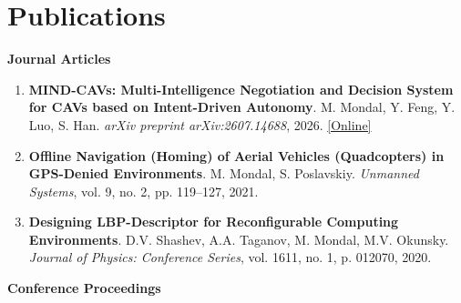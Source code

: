 \section*{Publications}

\textbf{Journal Articles}

\begin{enumerate}[leftmargin=*,noitemsep,nolistsep]

\item \textbf{MIND-CAVs: Multi-Intelligence Negotiation and Decision System for CAVs based on Intent-Driven Autonomy}.
M. Mondal, Y. Feng, Y. Luo, S. Han. \textit{arXiv preprint arXiv:2607.14688}, 2026. \href{https://arxiv.org/abs/2607.14688}{[Online]}

\item \textbf{Offline Navigation (Homing) of Aerial Vehicles (Quadcopters) in GPS-Denied Environments}.  
M. Mondal, S. Poslavskiy. \textit{Unmanned Systems}, vol. 9, no. 2, pp. 119--127, 2021.

\item \textbf{Designing LBP-Descriptor for Reconfigurable Computing Environments}.  
D.V. Shashev, A.A. Taganov, M. Mondal, M.V. Okunsky. \textit{Journal of Physics: Conference Series}, vol. 1611, no. 1, p. 012070, 2020.

\end{enumerate}

\vspace{0.05cm}
\textbf{Conference Proceedings}

